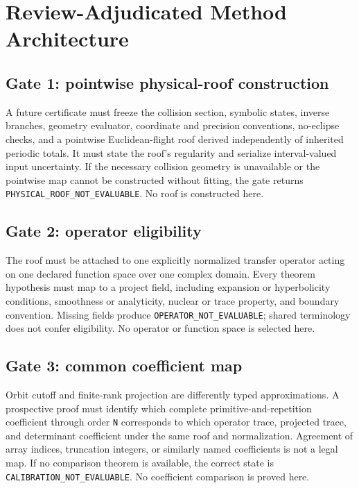 \documentclass[11pt,a4paper]{article}
\begin{document}
\section{Review-Adjudicated Method Architecture}

\subsection{Gate 1: pointwise physical-roof construction}

A future certificate must freeze the collision section, symbolic states, inverse branches, geometry evaluator, coordinate and precision conventions, no-eclipse checks, and a pointwise Euclidean-flight roof derived independently of inherited periodic totals. It must state the roof's regularity and serialize interval-valued input uncertainty. If the necessary collision geometry is unavailable or the pointwise map cannot be constructed without fitting, the gate returns \texttt{PHYSICAL\_ROOF\_NOT\_EVALUABLE}. No roof is constructed here.

\subsection{Gate 2: operator eligibility}

The roof must be attached to one explicitly normalized transfer operator acting on one declared function space over one complex domain. Every theorem hypothesis must map to a project field, including expansion or hyperbolicity conditions, smoothness or analyticity, nuclear or trace property, and boundary convention. Missing fields produce \texttt{OPERATOR\_NOT\_EVALUABLE}; shared terminology does not confer eligibility. No operator or function space is selected here.

\subsection{Gate 3: common coefficient map}

Orbit cutoff and finite-rank projection are differently typed approximations. A prospective proof must identify which complete primitive-and-repetition coefficient through order \texttt{N} corresponds to which operator trace, projected trace, and determinant coefficient under the same roof and normalization. Agreement of array indices, truncation integers, or similarly named coefficients is not a legal map. If no comparison theorem is available, the correct state is \texttt{CALIBRATION\_NOT\_EVALUABLE}. No coefficient comparison is proved here.
\end{document}
